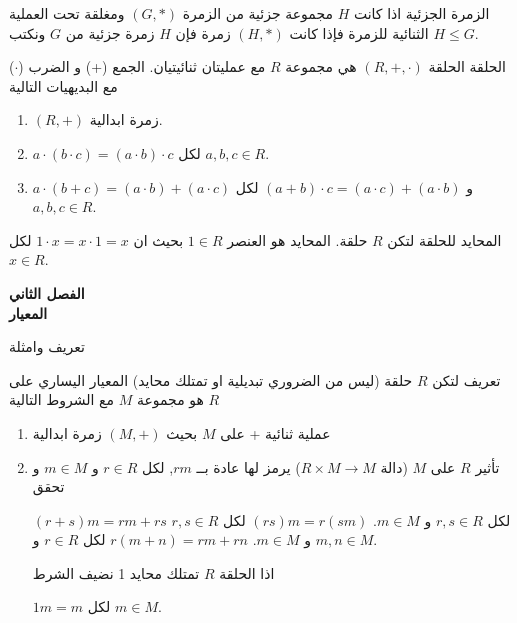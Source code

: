 	\begin{frame}
		
		\pause
		\begin{exampleblock}{الزمرة الجزئية}
				اذا كانت $H$ مجموعة جزئية من الزمرة $(G, *)$ ومغلقة تحت العملية الثنائية للزمرة فإذا كانت $(H, *)$ زمرة فإن $H$ زمرة جزئية من $G$ ونكتب $H\leq G$.
		\end{exampleblock}
		
		\pause
		\begin{exampleblock}{الحلقة}
		الحلقة $(R, +, \cdot)$ هي مجموعة $R$ مع عمليتان ثنائيتيان. الجمع (+) و الضرب ($\cdot$) مع البديهيات التالية
		\begin{enumerate}
			\item $(R, +)$ زمرة ابدالية.
			\item $a\cdot(b\cdot c) = (a\cdot b)\cdot c$ لكل $a, b, c\in R$.
			\item $a\cdot(b+c) = (a\cdot b) + (a\cdot c)$ و $(a+b)\cdot c = (a\cdot c) + (a\cdot b)$ لكل $a, b, c\in R$. 
		\end{enumerate}
		\end{exampleblock}
		
		\pause
		\begin{exampleblock}{المحايد للحلقة}
			لتكن $R$ حلقة. المحايد هو العنصر $1\in R$ بحيث ان $1\cdot x= x\cdot1=x$ لكل $x\in R$.
		\end{exampleblock}
	\end{frame}
	
	\begin{frame}
		\begin{center}
			\Huge
			\textbf{الفصل الثاني}\\
			\textbf{المعيار}
		\end{center}
	\end{frame}
	
	\begin{frame}{تعريف وامثلة}
		
		\pause
		\begin{exampleblock}{تعريف}
			لتكن $R$ حلقة (ليس من الضروري تبديلية او تمتلك محايد) المعيار اليساري على $R$ هو مجموعة $M$ مع الشروط التالية
			\begin{enumerate}
				\item عملية ثنائية + على $M$ بحيث $(M, +)$ زمرة ابدالية
				\item تأثير $R$ على $M$ (دالة $R\times M \to M$) يرمز لها عادة بــ $rm$, لكل $r\in R$ و $m\in M$ و تحقق
				\begin{tasks}
					\task $(r+s)m = rm + rs$ لكل $r,s\in R$ و $m\in M$.
					\task $(rs)m=r(sm)$ لكل $r,s\in R$ و $m\in M$.
					\task $r(m+n) = rm+rn$ لكل $r\in R$ و $m,n\in M$.
				\end{tasks}
				اذا الحلقة $R$ تمتلك محايد 1 نضيف الشرط
				\begin{tasks}[resume]
					\task $1m = m$ لكل $m\in M$.
				\end{tasks}
			\end{enumerate}
		\end{exampleblock}
	\end{frame}
	
